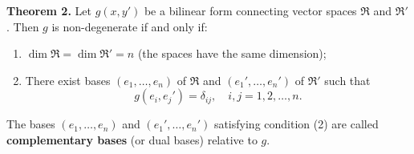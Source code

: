 \textbf{Theorem 2.} Let $g(x, y')$ be a bilinear form connecting vector spaces $\mathfrak{R}$ and $\mathfrak{R}'$. Then $g$ is non-degenerate if and only if:

\begin{enumerate}
\item $\dim \mathfrak{R} = \dim \mathfrak{R}' = n$ (the spaces have the same dimension);
\item There exist bases $(e_1, \dots, e_n)$ of $\mathfrak{R}$ and $(e_1', \dots, e_n')$ of $\mathfrak{R}'$ such that
$$g(e_i, e_j') = \delta_{ij}, \quad i, j = 1, 2, \dots, n.$$
\end{enumerate}

The bases $(e_1, \dots, e_n)$ and $(e_1', \dots, e_n')$ satisfying condition (2) are called \textbf{complementary bases} (or dual bases) relative to $g$.
